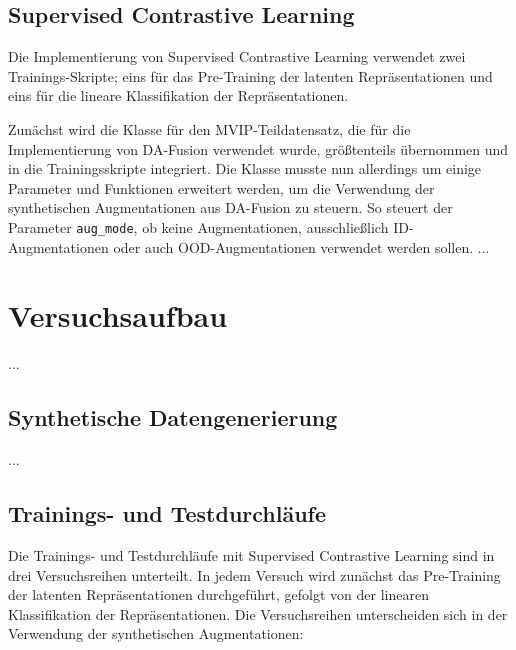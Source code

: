 \subsection{Supervised Contrastive Learning} \label{sec:supcon-implementation}

Die Implementierung von Supervised Contrastive Learning verwendet zwei Trainings-Skripte; eins für das Pre-Training der latenten Repräsentationen und eins für die lineare Klassifikation der Repräsentationen.

Zunächst wird die Klasse für den MVIP-Teildatensatz, die für die Implementierung von DA-Fusion verwendet wurde, größtenteils übernommen und in die Trainingsskripte integriert. Die Klasse musste nun allerdings um einige Parameter und Funktionen erweitert werden, um die Verwendung der synthetischen Augmentationen aus DA-Fusion zu steuern. So steuert der Parameter \lstinline{aug_mode}, ob keine Augmentationen, ausschließlich ID-Augmentationen oder auch OOD-Augmentationen verwendet werden sollen. ... %




\section{Versuchsaufbau} \label{sec:experiment-setup}

...

\subsection{Synthetische Datengenerierung} \label{sec:da-fusion-setup}

...

\subsection{Trainings- und Testdurchläufe} \label{sec:supcon-setup}

Die Trainings- und Testdurchläufe mit Supervised Contrastive Learning sind in drei Versuchsreihen unterteilt. In jedem Versuch wird zunächst das Pre-Training der latenten Repräsentationen durchgeführt, gefolgt von der linearen Klassifikation der Repräsentationen. Die Versuchsreihen unterscheiden sich in der Verwendung der synthetischen Augmentationen:

